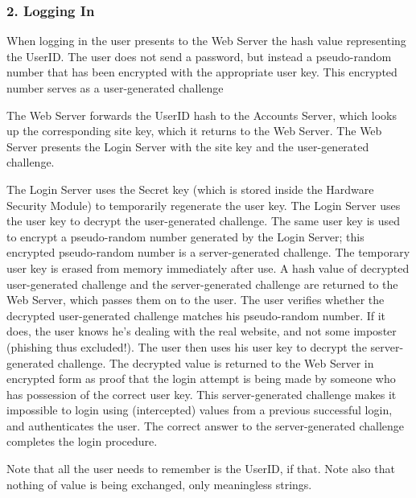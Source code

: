 \subsubsection{2. Logging In}
When logging in the user presents to the Web Server the hash value representing the UserID.
The user does not send a password, but instead a pseudo-random number that has been encrypted with the appropriate user key.
This encrypted number serves as a user-generated challenge
\par
The Web Server forwards the UserID hash to the Accounts Server, which looks up the corresponding site key, which it returns to the Web Server.
The Web Server presents the Login Server with the site key and the user-generated challenge.
\par
The Login Server uses the Secret key (which is stored inside the Hardware Security Module) to temporarily regenerate the user key.
The Login Server uses the user key to decrypt the user-generated challenge.
The same user key is used to encrypt a pseudo-random number generated by the Login Server; this encrypted pseudo-random number is a server-generated challenge.
The temporary user key is erased from memory immediately after use.
A hash value of decrypted user-generated challenge and the server-generated challenge are returned to the Web Server, which passes them on to the user.
The user verifies whether the decrypted user-generated challenge matches his pseudo-random number.
If it does, the user knows he's dealing with the real website, and not some imposter (phishing thus excluded!).
The user then uses his user key to decrypt the server-generated challenge.
The decrypted value is returned to the Web Server in encrypted form as proof that the login attempt is being made by someone who has possession of the correct user key.
This server-generated challenge makes it impossible to login using (intercepted) values from a previous successful login, and authenticates the user.
The correct answer to the server-generated challenge completes the login procedure.
\par
Note that all the user needs to remember is the UserID, if that.
Note also that nothing of value is being exchanged, only meaningless strings.
%
